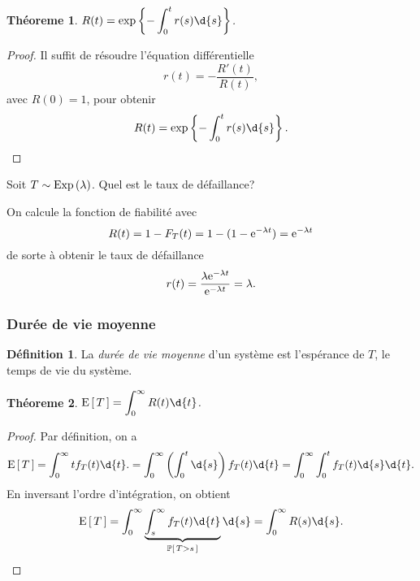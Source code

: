 \documentclass[11pt]{article}
\makeatletter
\renewcommand\P[1]{%
	\ensuremath{%
		\mathbb{P}\left[\,#1\,\right]%
	}%
}%
\newcommand\e{%
	\ensuremath{%
		\mathrm{e}%
	}%
}%
\newcommand\Exp[1]{%
	\ensuremath{%
		\mathrm{Exp}\left(#1\right)%
	}%
}%
\newcommand\Esp[1]{%
	\ensuremath{%
		\mathrm{E}\left[\,#1\,\right]%
	}%
}%
\newtheorem{theoreme}{Théoreme}[section]
\theoremstyle{remark}
\theoremstyle{definition}
\newtheorem*{@definition}{Définition}
\newenvironment{definition}{%
	\begin{@definition}%
}{%
	\end{@definition}%
	\setcounter{property}{0}%
}
\makeatother
\begin{document}
\begin{theoreme}
	$R(t)=\exp\left\{-\displaystyle\int_0^tr(s)\d{s}\right\}$.
\end{theoreme}

\begin{proof}
	Il suffit de résoudre l'équation différentielle
	\begin{equation*}
		r(t)=-\frac{R'(t)}{R(t)},
	\end{equation*}
	avec $R(0)=1$, pour obtenir
	\begin{equation*}
		R(t)=\exp\left\{-\int_0^tr(s)\d{s}\right\}.\qedhere
	\end{equation*}
\end{proof}

\begin{exemple}
	Soit $T\sim\Exp{\lambda}$. Quel est le taux de défaillance?

	On calcule la fonction de fiabilité avec
	\begin{equation*}
		R(t)
		=1-F_T(t)
		=1-(1-\e^{-\lambda t})
		=\e^{-\lambda t}
	\end{equation*}
	de sorte à obtenir le taux de défaillance
	\begin{equation*}
		r(t)
		=\frac{\lambda\e^{-\lambda t}}{\e^{-\lambda t}}
		=\lambda.
	\end{equation*}
\end{exemple}

\subsubsection{Durée de vie moyenne}
\begin{definition}
	La \textit{durée de vie moyenne} d'un système est l'espérance de $T$, le
	temps de vie du système.
\end{definition}

\begin{theoreme}
	$\Esp{T}=\displaystyle\int_0^\infty R(t)\d{t}$.
\end{theoreme}

\begin{proof}
	Par définition, on a
	\begin{equation*}
		\Esp{T}
		=\int_0^\infty tf_T(t)\d{t}.
		=\int_0^\infty\left(\int_0^t\d{s}\right)f_T(t)\d{t}
		=\int_0^\infty\int_0^tf_T(t)\d{s}\d{t}.
	\end{equation*}
	En inversant l'ordre d'intégration, on obtient
	\begin{equation*}
		\Esp{T}
		=\int_0^\infty\underbrace{\int_s^\infty f_T(t)\d{t}}_{\P{T>s}}\d{s}
		=\int_0^\infty R(s)\d{s}.\qedhere
	\end{equation*}
\end{proof}
\end{document}
